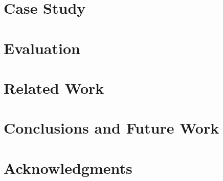 \section{Case Study}\label{sec:case_study}
	\linespread{0.87}
	

%
\section{Evaluation}\label{sec:evaluation}
	\linespread{0.87}
	

\section{Related Work}\label{sec:related_work}
		\linespread{0.87}
		

%	

\section{Conclusions and Future Work}\label{sec:conclusion}
		\linespread{0.87}
		

\section*{Acknowledgments}
	\linespread{0.87}
	


